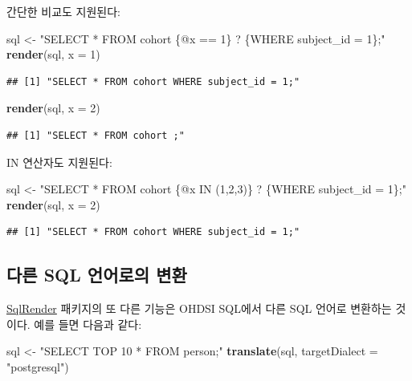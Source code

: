 \documentclass[10.5pt]{book}
\newenvironment{Shaded}{\begin{snugshade}}{\end{snugshade}}
\newcommand{\KeywordTok}[1]{\textcolor[rgb]{0.13,0.29,0.53}{\textbf{#1}}}
\newcommand{\DataTypeTok}[1]{\textcolor[rgb]{0.13,0.29,0.53}{#1}}
\newcommand{\DecValTok}[1]{\textcolor[rgb]{0.00,0.00,0.81}{#1}}
\newcommand{\StringTok}[1]{\textcolor[rgb]{0.31,0.60,0.02}{#1}}
\newcommand{\NormalTok}[1]{#1}
\theoremstyle{definition}
\theoremstyle{definition}
\theoremstyle{definition}
\theoremstyle{remark}
\begin{document}
간단한 비교도 지원된다:

\begin{Shaded}
\begin{Highlighting}[]
\NormalTok{sql <-}\StringTok{ "SELECT * FROM cohort \{@x == 1\} ? \{WHERE subject_id = 1\};"}
\KeywordTok{render}\NormalTok{(sql, }\DataTypeTok{x =} \DecValTok{1}\NormalTok{)}
\end{Highlighting}
\end{Shaded}

\begin{verbatim}
## [1] "SELECT * FROM cohort WHERE subject_id = 1;"
\end{verbatim}

\begin{Shaded}
\begin{Highlighting}[]
\KeywordTok{render}\NormalTok{(sql, }\DataTypeTok{x =} \DecValTok{2}\NormalTok{)}
\end{Highlighting}
\end{Shaded}

\begin{verbatim}
## [1] "SELECT * FROM cohort ;"
\end{verbatim}

IN 연산자도 지원된다:

\begin{Shaded}
\begin{Highlighting}[]
\NormalTok{sql <-}\StringTok{ "SELECT * FROM cohort \{@x IN (1,2,3)\} ? \{WHERE subject_id = 1\};"}
\KeywordTok{render}\NormalTok{(sql, }\DataTypeTok{x =} \DecValTok{2}\NormalTok{)}
\end{Highlighting}
\end{Shaded}

\begin{verbatim}
## [1] "SELECT * FROM cohort WHERE subject_id = 1;"
\end{verbatim}

\subsection{다른 SQL 언어로의 변환}\label{-sql--}

\href{https://ohdsi.github.io/SqlRender/}{SqlRender} 패키지의 또 다른
기능은 OHDSI SQL에서 다른 SQL 언어로 변환하는 것이다. 예를 들면 다음과
같다:

\begin{Shaded}
\begin{Highlighting}[]
\NormalTok{sql <-}\StringTok{ "SELECT TOP 10 * FROM person;"}
\KeywordTok{translate}\NormalTok{(sql, }\DataTypeTok{targetDialect =} \StringTok{"postgresql"}\NormalTok{)}
\end{Highlighting}
\end{Shaded}
\end{document}
